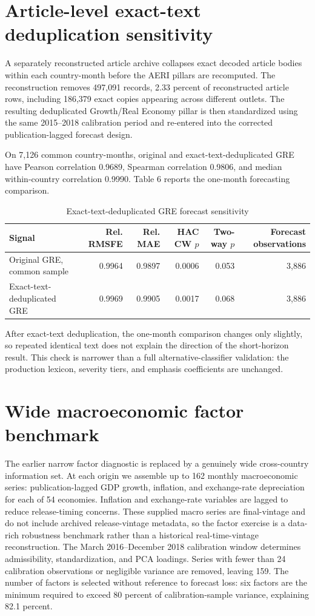 \documentclass[12pt]{article}
\begin{document}
\section{Article-level exact-text deduplication sensitivity}
A separately reconstructed article archive collapses exact decoded article bodies within each country-month before the AERI pillars are recomputed. The reconstruction removes 497,091 records, 2.33 percent of reconstructed article rows, including 186,379 exact copies appearing across different outlets. The resulting deduplicated Growth/Real Economy pillar is then standardized using the same 2015--2018 calibration period and re-entered into the corrected publication-lagged forecast design.

On 7,126 common country-months, original and exact-text-deduplicated GRE have Pearson correlation 0.9689, Spearman correlation 0.9806, and median within-country correlation 0.9990. Table 6 reports the one-month forecasting comparison.
\begin{table}[htbp]
\centering\scriptsize
\caption{Exact-text-deduplicated GRE forecast sensitivity}
\begin{tabular}{lrrrrr}
\toprule
Signal & Rel. RMSFE & Rel. MAE & HAC CW $p$ & Two-way $p$ & Forecast observations\\
\midrule
Original GRE, common sample & 0.9964 & 0.9897 & 0.0006 & 0.053 & 3,886\\
Exact-text-deduplicated GRE & 0.9969 & 0.9905 & 0.0017 & 0.068 & 3,886\\
\bottomrule
\end{tabular}
\end{table}
After exact-text deduplication, the one-month comparison changes only slightly, so repeated identical text does not explain the direction of the short-horizon result. This check is narrower than a full alternative-classifier validation: the production lexicon, severity tiers, and emphasis coefficients are unchanged.

\section{Wide macroeconomic factor benchmark}
The earlier narrow factor diagnostic is replaced by a genuinely wide cross-country information set. At each origin we assemble up to 162 monthly macroeconomic series: publication-lagged GDP growth, inflation, and exchange-rate depreciation for each of 54 economies. Inflation and exchange-rate variables are lagged to reduce release-timing concerns. These supplied macro series are final-vintage and do not include archived release-vintage metadata, so the factor exercise is a data-rich robustness benchmark rather than a historical real-time-vintage reconstruction. The March 2016--December 2018 calibration window determines admissibility, standardization, and PCA loadings. Series with fewer than 24 calibration observations or negligible variance are removed, leaving 159. The number of factors is selected without reference to forecast loss: six factors are the minimum required to exceed 80 percent of calibration-sample variance, explaining 82.1 percent.
\end{document}
